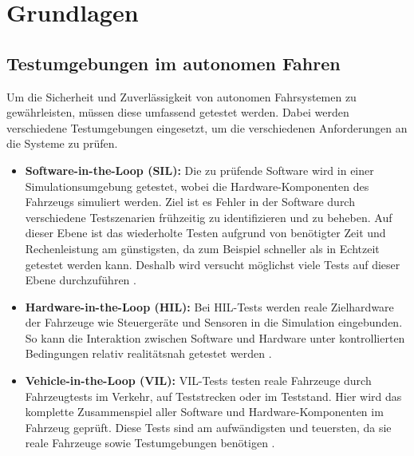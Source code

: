 \chapter{Grundlagen}

\section{Testumgebungen im autonomen Fahren}
Um die Sicherheit und Zuverlässigkeit von autonomen Fahrsystemen zu gewährleisten, müssen diese umfassend getestet werden. 
Dabei werden verschiedene Testumgebungen eingesetzt, um die verschiedenen Anforderungen an die Systeme zu prüfen. 

\begin{itemize}
    \item \textbf{Software-in-the-Loop (SIL):} %
            Die zu prüfende Software wird in einer Simulationsumgebung getestet, wobei die Hardware-Komponenten des Fahrzeugs simuliert werden. 
            Ziel ist es Fehler in der Software durch verschiedene Testszenarien frühzeitig zu identifizieren und zu beheben.
            Auf dieser Ebene ist das wiederholte Testen aufgrund von benötigter Zeit und Rechenleistung am günstigsten, da zum Beispiel schneller als in Echtzeit getestet werden kann. 
            Deshalb wird versucht möglichst viele Tests auf dieser Ebene durchzuführen \cite{EinfuehrungIntegrationsprojekt}.
    \item \textbf{Hardware-in-the-Loop (HIL):} %
            Bei HIL-Tests werden reale Zielhardware der Fahrzeuge wie Steuergeräte und Sensoren in die Simulation eingebunden. 
            So kann die Interaktion zwischen Software und Hardware unter kontrollierten Bedingungen relativ realitätsnah getestet werden \cite{EinfuehrungIntegrationsprojekt}.
    \item \textbf{Vehicle-in-the-Loop (VIL):} %
            VIL-Tests testen reale Fahrzeuge durch Fahrzeugtests im Verkehr, auf Teststrecken oder im Teststand. 
            Hier wird das komplette Zusammenspiel aller Software und Hardware-Komponenten im Fahrzeug geprüft.
            Diese Tests sind am aufwändigsten und teuersten, da sie reale Fahrzeuge sowie Testumgebungen benötigen \cite{EinfuehrungIntegrationsprojekt}.
\end{itemize}
